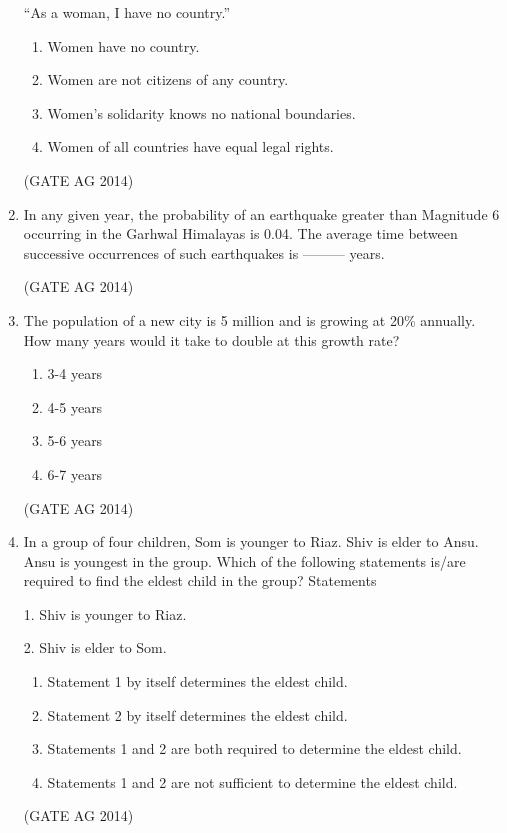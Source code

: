\documentclass[journal,12pt,onecolumn]{IEEEtran}
\begin{document}
\begin{enumerate}
    “As a woman, I have no country.”
    \begin{enumerate}
        \item Women have no country.
        \item Women are not citizens of any country.
        \item Women’s solidarity knows no national boundaries.
        \item Women of all countries have equal legal rights.
    \end{enumerate}
    \hfill(GATE AG 2014)

    \item In any given year, the probability of an earthquake greater than Magnitude 6 occurring in the Garhwal Himalayas is 0.04. The average time between successive occurrences of such earthquakes is --------- years.

    \hfill(GATE AG 2014)

    \item The population of a new city is 5 million and is growing at 20\% annually. How many years would it take to double at this growth rate?
    \begin{multicols}{4}
    \begin{enumerate}
        \item 3-4 years
        \item 4-5 years
        \item 5-6 years
        \item 6-7 years
    \end{enumerate}
    \end{multicols}
    \hfill(GATE AG 2014)

    \item In a group of four children, Som is younger to Riaz. Shiv is elder to Ansu. Ansu is youngest in the group. Which of the following statements is/are required to find the eldest child in the group?
    Statements
    
    1. Shiv is younger to Riaz.
    
    2. Shiv is elder to Som.
    \begin{enumerate}
        \item Statement 1 by itself determines the eldest child.
        \item Statement 2 by itself determines the eldest child.
        \item Statements 1 and 2 are both required to determine the eldest child.
        \item Statements 1 and 2 are not sufficient to determine the eldest child.
    \end{enumerate}
    \hfill(GATE AG 2014)


\end{enumerate}
\end{document}
